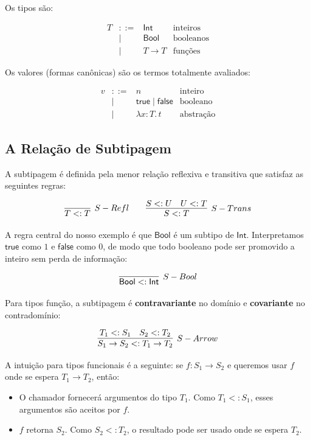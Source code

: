 Os tipos são:

\[
  \begin{array}{rcll}
    T & ::= & \mathsf{Int}  & \text{inteiros} \\
      & |   & \mathsf{Bool} & \text{booleanos} \\
      & |   & T \to T       & \text{funções}
  \end{array}
\]

Os valores (formas canônicas) são os termos totalmente avaliados:

\[
  \begin{array}{rcll}
    v & ::= & n & \text{inteiro} \\
      & |   & \mathsf{true} \mid \mathsf{false} & \text{booleano} \\
      & |   & \lambda x {:} T.\, t & \text{abstração}
  \end{array}
\]

\subsection{A Relação de Subtipagem}

A subtipagem é definida pela menor relação reflexiva e transitiva que
satisfaz as seguintes regras:

\[ \infer[S-Refl]{T <: T}{} \qquad \infer[S-Trans]{S <: T}{S <: U \quad U <: T}
\]

A regra central do nosso exemplo é que \(\mathsf{Bool}\) é um subtipo
de \(\mathsf{Int}\). Interpretamos \(\mathsf{true}\) como \(1\) e
\(\mathsf{false}\) como \(0\), de modo que todo booleano pode ser
promovido a inteiro sem perda de informação:

\[ \infer[S-Bool]{\mathsf{Bool} <: \mathsf{Int}}{} \]

Para tipos função, a subtipagem é \textbf{contravariante} no domínio
e \textbf{covariante} no contradomínio:

\[ \infer[S-Arrow]{S_1 \to S_2 <: T_1 \to T_2}{T_1 <: S_1 \quad S_2 <: T_2} \]

A intuição para tipos funcionais é a seguinte: se \(f : S_1 \to S_2\)
e queremos usar \(f\) onde se espera \(T_1 \to T_2\), então:

\begin{itemize}
  \item
    O chamador fornecerá argumentos do tipo \(T_1\). Como \(T_1 <:
    S_1\), esses argumentos são aceitos por \(f\).
  \item
    \(f\) retorna \(S_2\). Como \(S_2 <: T_2\), o resultado pode ser
    usado onde se espera \(T_2\).
\end{itemize}

